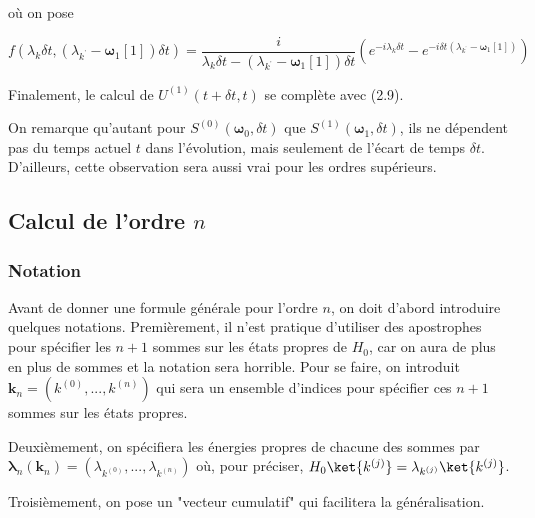 où on pose

\begin{equation}
    f(\lambda_k\delta t, (\lambda_{k^\text{'}}-\boldsymbol{\omega}_1[1])\delta t) = \frac{i}{\lambda_k\delta t - (\lambda_{k^\text{'}} - \boldsymbol{\omega}_1[1])\delta t}\left(e^{-i\lambda_k\delta t} - e^{-i\delta t(\lambda_{k^\text{'}} - \boldsymbol{\omega}_1[1])} \right) 
\end{equation}

Finalement, le calcul de $U^{(1)}(t + \delta t, t)$ se complète avec (2.9).

On remarque qu'autant pour $S^{(0)}(\boldsymbol{\omega}_0, \delta t)$ que $S^{(1)}(\boldsymbol{\omega}_1, \delta t)$, ils ne dépendent pas du temps actuel $t$ dans l'évolution, mais seulement de l'écart de temps $\delta t$. D'ailleurs, cette observation sera aussi vrai pour les ordres supérieurs. 


\subsection{Calcul de l'ordre $n$}
\subsubsection{Notation}
Avant de donner une formule générale pour l'ordre $n$, on doit d'abord introduire quelques notations. Premièrement, il n'est pratique d'utiliser des apostrophes pour spécifier les $n+1$ sommes sur les états propres de $H_0$, car on aura de plus en plus de sommes et la notation sera horrible. Pour se faire, on introduit $\boldsymbol{k}_n = (k^{(0)}, ..., k^{(n)})$ qui sera un ensemble d'indices pour spécifier ces $n+1$ sommes sur les états propres.

Deuxièmement, on spécifiera les énergies propres de chacune des sommes par $\boldsymbol{\lambda}_n(\boldsymbol{k}_n) = (\lambda_{k^{(0)}}, ..., \lambda_{k^{(n)}})$ où, pour préciser, $H_0\ket{k^{(j)}} = \lambda_{k^{(j)}}\ket{k^{(j)}}$.

Troisièmement, on pose un "vecteur cumulatif" qui facilitera la généralisation.

